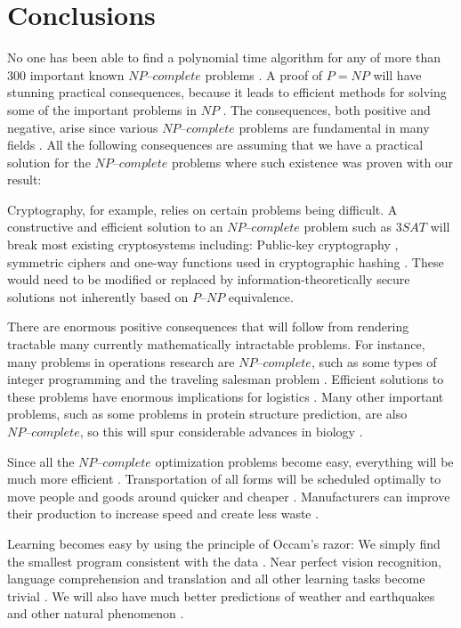\documentclass[a4paper,UKenglish,cleveref, autoref]{lipics-v2019}
\begin{document}
\section{Conclusions}

No one has been able to find a polynomial time algorithm for any of more than $300$ important known $\textit{NP--complete}$ problems \cite{GJ79}. A proof of $P = NP$ will have stunning practical consequences, because it leads to efficient methods for solving some of the important problems in $NP$ \cite{CS00}. The consequences, both positive and negative, arise since various $\textit{NP--complete}$ problems are fundamental in many fields \cite{CS00}. All the following consequences are assuming that we have a practical solution for the $\textit{NP--complete}$ problems where such existence was proven with our result:

Cryptography, for example, relies on certain problems being difficult. A constructive and efficient solution to an $\textit{NP--complete}$ problem such as $3SAT$ will break most existing cryptosystems including: Public-key cryptography \cite{HW97}, symmetric ciphers \cite{MM00} and one-way functions used in cryptographic hashing \cite{DKV07}. These would need to be modified or replaced by information-theoretically secure solutions not inherently based on $\textit{P--NP}$ equivalence.

There are enormous positive consequences that will follow from rendering tractable many currently mathematically intractable problems. For instance, many problems in operations research are $\textit{NP--complete}$, such as some types of integer programming and the traveling salesman problem \cite{GJ79}. Efficient solutions to these problems have enormous implications for logistics \cite{CS00}. Many other important problems, such as some problems in protein structure prediction, are also $\textit{NP--complete}$, so this will spur considerable advances in biology \cite{BL98}.

Since all the $\textit{NP--complete}$ optimization problems become easy, everything will be much more efficient \cite{LF09}. Transportation of all forms will be scheduled optimally to move people and goods around quicker and cheaper \cite{LF09}. Manufacturers can improve their production to increase speed and create less waste \cite{LF09}.

Learning becomes easy by using the principle of Occam's razor: We simply find the smallest program consistent with the data \cite{LF09}. Near perfect vision recognition, language comprehension and translation and all other learning tasks become trivial \cite{LF09}. We will also have much better predictions of weather and earthquakes and other natural phenomenon \cite{LF09}.
\end{document}
